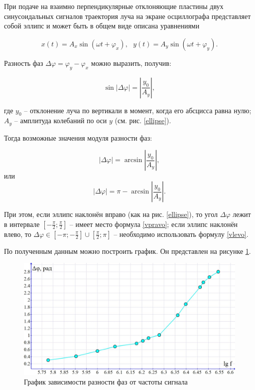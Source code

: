 \documentclass[a4paper,12pt]{article} %
\begin{document}
При подаче на взаимно перпендикулярные отклоняющие пластины двух
синусоидальных сигналов траектория луча на экране осциллографа
представляет собой эллипс и может быть в общем виде описана
уравнениями

\begin{equation}
x\left(t\right) = A_x \sin\left(\omega t + \varphi_x\right),\text{ }y\left(t\right) = A_y \sin\left(\omega t + \varphi_y\right).
\end{equation}

Разность фаз $ \Delta \varphi = \varphi_y - \varphi_x $ можно выразить, получив:

\begin{equation}
\sin \left|\Delta \varphi\right| = \left|\frac{y_0}{A_y}\right|,
\end{equation}

где $ y_0 $ -- отклонение луча по вертикали в момент, когда его абсцисса
равна нулю; $ A_y $ -- амплитуда колебаний по оси $ y $ (см. рис. \ref{ellipse}).

Тогда
возможные значения модуля разности фаз:

\begin{equation}
\left|\Delta \varphi\right|=\arcsin\left|\frac{y_0}{A_y}\right|, \label{vpravo}
\end{equation}
или
\begin{equation}
\left|\Delta \varphi\right|=\pi - \arcsin\left|\frac{y_0}{A_y}\right|. \label{vlevo}
\end{equation}

При этом, если эллипс наклонён вправо (как на рис. \ref{ellipse}), то угол $ \Delta \varphi $ лежит в
интервале $ \left[-\frac{\pi}{2};\frac{\pi}{2}\right] $ -- имеет место формула \eqref{vpravo}; если эллипс наклонён влево, то $ \Delta \varphi \in \left[-\pi;-\frac{\pi}{2}\right]\cup\left[\frac{\pi}{2};\pi \right] $ -- необходимо использовать формулу \eqref{vlevo}.

По полученным данным можно построить график. Он представлен на рисунке \ref{raz_faz_graph}.

\begin{figure}[H]
	\includegraphics[scale=0.388]{raz_faz.jpg}
	\caption{График зависимости разности фаз от частоты сигнала}
	\label{raz_faz_graph}
\end{figure}
\end{document}
